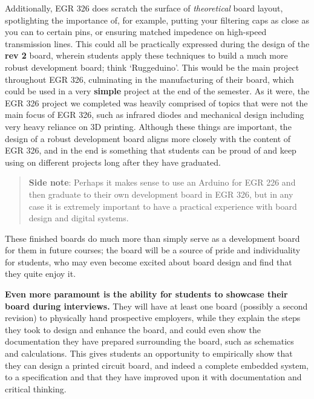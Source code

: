 \documentclass[12pt]{article}
\numberwithin{figure}{section}
\numberwithin{equation}{section}
\begin{document}
{\bigskip

Additionally, EGR 326 does scratch the surface of \emph{theoretical}
board layout, spotlighting the importance of, for example, putting your
filtering caps as close as you can to certain pins, or ensuring matched
impedence on high-speed transmission lines. This could all be
practically expressed during the design of the \textbf{rev 2} board,
wherein students apply these techniques to build a much more robust
development board; think `Ruggeduino'. This would be the main project
throughout EGR 326, culminating in the manufacturing of their board,
which could be used in a very \textbf{simple} project at the end of the
semester. As it were, the EGR 326 project we completed was heavily
comprised of topics that were not the main focus of EGR 326, such as
infrared diodes and mechanical design including very heavy reliance on
3D printing. Although these things are important, the design of a robust
development board aligns more closely with the content of EGR 326, and
in the end is something that students can be proud of and keep using on
different projects long after they have graduated.

\begin{quote}
\textbf{Side note}: Perhaps it makes sense to use an Arduino for EGR 226
and then graduate to their own development board in EGR 326, but in any
case it is extremely important to have a practical experience with board
design and digital systems.
\end{quote}

These finished boards do much more than simply serve as a development
board for them in future courses; the board will be a source of pride
and individuality for students, who may even become excited about board
design and find that they quite enjoy it.

\bigskip

\textbf{Even more paramount is the ability for students to showcase
their board during interviews.} They will have at least one board
(possibly a second revision) to physically hand prospective employers,
while they explain the steps they took to design and enhance the board,
and could even show the documentation they have prepared surrounding the
board, such as schematics and calculations. This gives students an
opportunity to empirically show that they can design a printed circuit
board, and indeed a complete embedded system, to a specification and
that they have improved upon it with documentation and critical
thinking.

\bigskip

}
\end{document}

